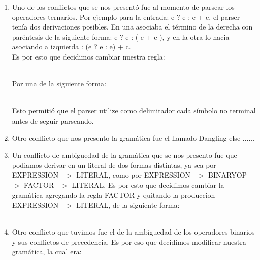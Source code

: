\begin{enumerate}
    
\item Uno de los conflictos que se nos presentó fue al momento de parsear los
operadores ternarios. Por ejemplo para la entrada: e ? e : e + c, el parser
tenía dos derivaciones posibles. En una asociaba el término de la derecha con
paréntesis de la siguiente forma: e ? e : ( e + c ), y en la otra lo hacia
asociando a izquierda : (e ? e : e) + c. \\
Es por esto que decidimos cambiar nuestra regla: 
\\
\begin{reglas}
\end{reglas}
\\
Por una de la siguiente forma:
\\
\begin{reglas}
\end{reglas}
\\
Esto permitió que el parser utilize como delimitador cada símbolo no terminal
antes de seguir parseando.

\item Otro conflicto que nos presento la gramática fue el llamado Dangling else
  ......

\item Un conflicto de ambiguedad de la gramática que se nos presento fue que
  podiamos derivar en un literal de dos formas distintas, ya sea por EXPRESSION
  --$>$ LITERAL, como por EXPRESSION --$>$ BINARYOP --$>$ FACTOR --$>$ LITERAL. Es por esto que decidimos cambiar la
  gramática agregando la regla FACTOR y quitando la produccion EXPRESSION --$>$
  LITERAL, de la siguiente forma:
  \\
  \\
  \begin{reglas} 
  \end{reglas}

\item Otro conflicto que tuvimos fue el de la ambiguedad de los operadores
  binarios y sus conflictos de precedencia. Es por eso que decidimos modificar
  nuestra gramática, la cual era:


\end{enumerate}
